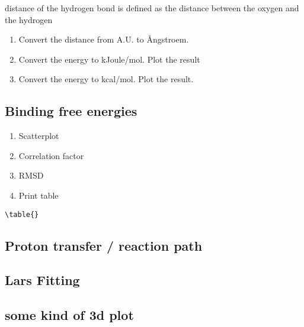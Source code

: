\documentclass{article}
\begin{document}
distance of the hydrogen bond is defined as the distance between the oxygen and the hydrogen

\begin{enumerate}

    \item Convert the distance from A.U. to \AA ngstroem.

    \item Convert the energy to kJoule/mol. Plot the result

    \item Convert the energy to kcal/mol. Plot the result.

\end{enumerate}



\newpage
\subsection{Binding free energies}

\begin{enumerate}

    \item Scatterplot

    \item Correlation factor

    \item RMSD

    \item Print table

\end{enumerate}



\begin{lstlisting}
\table{}

\end{lstlisting}



\newpage
\subsection{Proton transfer / reaction path}


\newpage
\subsection{Lars Fitting}


\newpage
\subsection{some kind of 3d plot}








\end{document}

